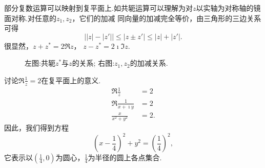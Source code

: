 部分复数运算可以映射到复平面上.如共轭运算可以理解为对$z$以实轴为对称轴的镜面对称.对任意的$z_1,z_2$，它们的加减
同向量的加减完全等价，由三角形的三边关系可得
\begin{equation}
    \left| |z|- |z'| \right| \leq |z \pm z'| \leq |z| + |z'| .
\end{equation}
很显然，$z+z^{*} = 2 \Re z$， $z-z^{*} = 2\imath \Im z$.
\begin{figure}
    \centering
    
\quad 
        
        \caption{左图:共轭$z^{*}$与$z$的关系; 右图:$z_1, z_2$的加减关系.}
    \end{figure}
\begin{examplebox}{讨论$\Re \frac{1}{z} = 2$在复平面上的意义.}
    \begin{align*}
        \Re \frac{1}{z} &= 2\\
        \Re \frac{1}{x+\imath y} &  = 2 \\
        \frac{x}{x^2 +y^2} & = 2 .
    \end{align*}
因此，我们得到方程
\begin{equation*}
    (x-\frac{1}{4})^2 + y^2 = \left( \frac{1}{4}\right)^2,
\end{equation*}
它表示以$(\frac{1}{4},0)$为圆心，$\frac{1}{4}$为半径的圆上各点集合.
\end{examplebox}
        


